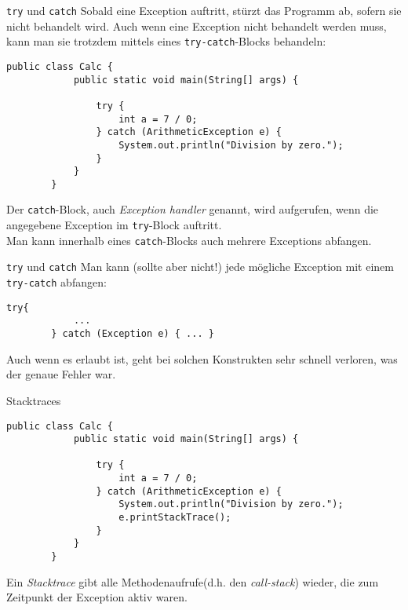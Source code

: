 \begin{frame}[fragile]{\texttt{try} und \texttt{catch}}
    Sobald eine Exception auftritt, stürzt das Programm ab, sofern sie nicht behandelt wird.
    Auch wenn eine Exception nicht behandelt werden muss, kann man sie trotzdem mittels eines \texttt{try-catch}-Blocks behandeln:
    \begin{lstlisting}[gobble=8]
        public class Calc {
            public static void main(String[] args) {

                try {
                    int a = 7 / 0;
                } catch (ArithmeticException e) {
                    System.out.println("Division by zero.");
                }
            }
        }
    \end{lstlisting}
    Der \texttt{catch}-Block, auch \textit{Exception handler} genannt,
    wird aufgerufen, wenn die angegebene Exception im \texttt{try}-Block auftritt.\\
    Man kann innerhalb eines \texttt{catch}-Blocks auch mehrere Exceptions abfangen.
\end{frame}

\begin{frame}[fragile]{\texttt{try} und \texttt{catch}}
    Man kann (sollte aber nicht!) jede mögliche Exception mit einem \texttt{try-catch} abfangen:
    \begin{lstlisting}[gobble=8]
        try{
            ...
        } catch (Exception e) { ... }
    \end{lstlisting}
    Auch wenn es erlaubt ist, geht bei solchen Konstrukten sehr schnell verloren, was der genaue Fehler war.
\end{frame}

\begin{frame}[fragile]{Stacktraces}
    \begin{lstlisting}[gobble=8]
        public class Calc {
            public static void main(String[] args) {

                try {
                    int a = 7 / 0;
                } catch (ArithmeticException e) {
                    System.out.println("Division by zero.");
                    e.printStackTrace();
                }
            }
        }
    \end{lstlisting}
    Ein \textit{Stacktrace} gibt alle Methodenaufrufe(d.h. den \textit{call-stack}) wieder, die zum Zeitpunkt der Exception aktiv waren.
\end{frame}

